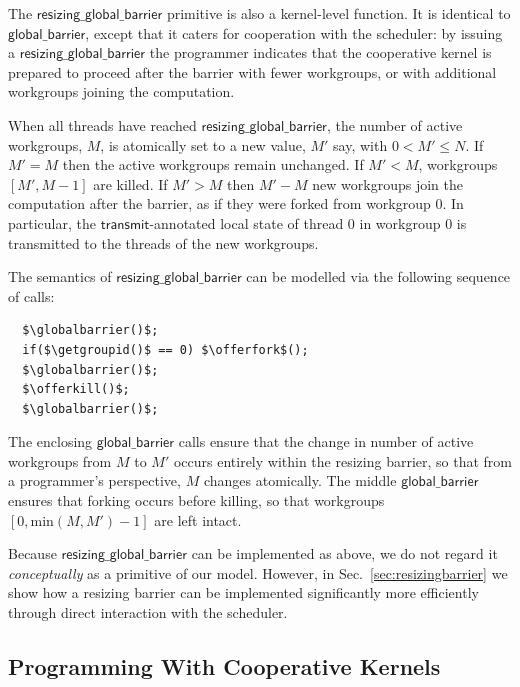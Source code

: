 \documentclass[numbers,nocopyrightspace,10pt]{sigplanconf}
\newcommand{\mysec}{Sec.~}
\newcommand{\transmit}{\mathsf{transmit}}
\newcommand{\offerfork}{\mathsf{offer\_fork}}
\newcommand{\offerkill}{\mathsf{offer\_kill}}
\newcommand{\globalbarrier}{\mathsf{global\_barrier}}
\newcommand{\resizingglobalbarrier}{\mathsf{resizing\_global\_barrier}}
\newcommand{\getgroupid}{\mathsf{get\_group\_id}}
\begin{document}
The $\resizingglobalbarrier$ primitive is also a kernel-level
function.  It is identical to $\globalbarrier$, except that it caters
for cooperation with the scheduler: by issuing a
$\resizingglobalbarrier$ the programmer indicates that the cooperative
kernel is prepared to proceed after the barrier with fewer workgroups,
or with additional workgroups joining the computation.

When all threads have reached $\resizingglobalbarrier$,
the number of active workgroups, $M$, is atomically set to a new value, $M'$ say, with $0 < M' \leq N$.
If $M' = M$ then the active workgroups remain unchanged.  If $M' < M$, workgroups $[M', M-1]$ are
killed.  If $M' > M$ then $M'-M$ new workgroups join the computation after the barrier,
as if they were forked from workgroup 0.  In particular, the
$\transmit$-annotated local state of thread 0 in workgroup 0 is
transmitted to the threads of the new workgroups.

The semantics of $\resizingglobalbarrier$ can be modelled via the following sequence of calls:

\lstset{basicstyle=\small\tt,numbers=none}
\begin{lstlisting}
  $\globalbarrier()$;
  if($\getgroupid()$ == 0) $\offerfork$();
  $\globalbarrier()$;
  $\offerkill()$;
  $\globalbarrier()$;
\end{lstlisting}
\lstset{basicstyle=\scriptsize\tt,numbers=left}

The enclosing $\globalbarrier$ calls ensure that the change in number
of active workgroups from $M$ to $M'$ occurs entirely within the
resizing barrier, so that from a programmer's perspective, $M$ changes atomically.  The middle $\globalbarrier$ ensures that forking occurs before killing, so that workgroups $[0, \textrm{min}(M, M') - 1]$ are left intact.

Because $\resizingglobalbarrier$ can be implemented as above, we do not regard it \emph{conceptually} as a primitive of our
model.  However, in
\mysec\ref{sec:resizingbarrier} we show how a resizing barrier can be
implemented significantly more efficiently through direct interaction with the scheduler.

\subsection{Programming With Cooperative Kernels}\label{sec:programmingguidelines}

\end{document}
